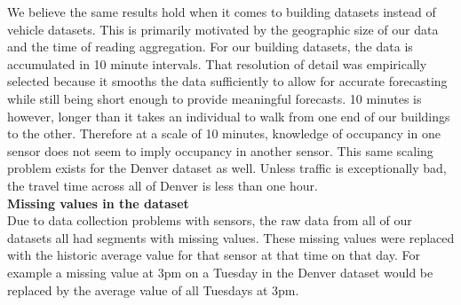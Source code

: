 We believe the same results hold when it comes to building datasets instead of vehicle datasets.  This is primarily motivated by the geographic size of our data and the time of reading aggregation.  For our building datasets, the data is accumulated in 10 minute intervals.  That resolution of detail was empirically selected because it smooths the data sufficiently to allow for accurate forecasting while still being short enough to provide meaningful forecasts.  10 minutes is however, longer than it takes an individual to walk from one end of our buildings to the other.  Therefore at a scale of 10 minutes, knowledge of occupancy in one sensor does not seem to imply occupancy in another sensor.  This same scaling problem exists for the Denver dataset as well.  Unless traffic is exceptionally bad, the travel time across all of Denver is less than one hour.\\

\noindent
\textbf{Missing values in the dataset} \\
Due to data collection problems with sensors, the raw data from all of our datasets all had segments with missing values.  These missing values were replaced with the historic average value for that sensor at that time on that day.  For example a missing value at 3pm on a Tuesday in the Denver dataset would be replaced by the average value of all Tuesdays at 3pm.




